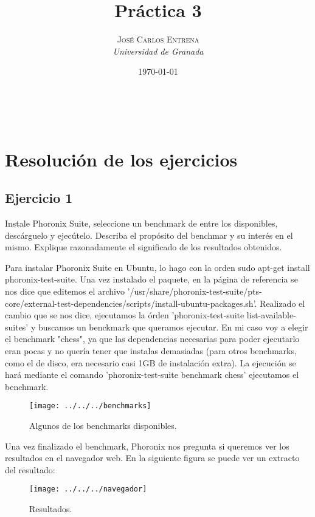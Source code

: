 \documentclass[a4paper, 11pt]{article} %
\title{\textbf{Práctica 3}\\ %
} %
\author{\textsc{José Carlos Entrena} %
\\{\textit{Universidad de Granada}}} %
\date{\today} %
\makeatletter
\renewcommand{\maketitle}{ %
\begin{flushright} %
{\LARGE\@title} %

\vspace{60pt} %

{\large\@author} %
\\\@date %

\vspace{40pt} %
\end{flushright}
}
\makeatother
\begin{document}
\maketitle %

{\parskip=2pt
  \tableofcontents
}   %

\pagebreak %

\section{Resolución de los ejercicios}

\subsection{Ejercicio 1}
Instale Phoronix Suite, seleccione un benchmark de entre los disponibles, descárguelo y ejecútelo. Describa el propósito del benchmar y su interés en el mismo. Explique razonadamente el significado de los resultados obtenidos. 

Para instalar Phoronix Suite en Ubuntu, lo hago con la orden sudo apt-get install phoronix-test-suite. Una vez instalado el paquete, en la página de referencia se nos dice que editemos el archivo '/usr/share/phoronix-test-suite/pts-core/external-test-dependencies/scripts/install-ubuntu-packages.sh'. Realizado el cambio que se nos dice, ejecutamos la órden 'phoronix-test-suite list-available-suites' y buscamos un benckmark que queramos ejecutar. En mi caso voy a elegir el benchmark "chess", ya que las dependencias necesarias para poder ejecutarlo eran pocas y no quería tener que instalas demasiadas (para otros benchmarks, como el de disco, era necesario casi 1GB de instalación extra). La ejecución se hará mediante el comando 'phoronix-test-suite benchmark chess' ejecutamos el benchmark. 

\begin{figure}[htpb]
\centering
\texttt{[image: ../../../benchmarks]}
\caption{Algunos de los benchmarks disponibles.}
\end{figure}

Una vez finalizado el benchmark, Phoronix nos pregunta si queremos ver los resultados en el navegador web. En la siguiente figura se puede ver un extracto del resultado: 

\begin{figure}[htpb]
\centering
\texttt{[image: ../../../navegador]}
\caption{Resultados.}
\end{figure}
\end{document}
